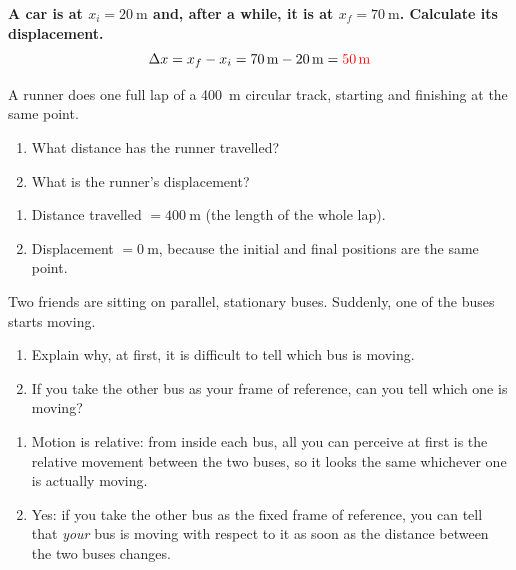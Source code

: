 \begin{example}
    \textbf{A car is at \(x_i = \qty{20}{\m}\) and, after a while, it is at \(x_f = \qty{70}{\m}\). Calculate its displacement.}
    \begin{equation*}
        \Delta x = x_f - x_i = \qty{70}{\m} - \qty{20}{\m} = \textcolor{red}{\qty{50}{\m}}
    \end{equation*}
\end{example}

\begin{exercise}
    A runner does one full lap of a \qty{400}{\m} circular track, starting and finishing at the same point.
    \begin{enumerate}[label=\letraminuscula]
        \item What distance has the runner travelled?
        \item What is the runner's displacement?
    \end{enumerate}
    \begin{solu}
        \begin{enumerate}[label=\alph*)]
            \item Distance travelled \(= \qty{400}{\m}\) (the length of the whole lap).
            \item Displacement \(= \qty{0}{\m}\), because the initial and final positions are the same point.
        \end{enumerate}
    \end{solu}
\end{exercise}

\begin{exercise}
    Two friends are sitting on parallel, stationary buses. Suddenly, one of the buses starts moving.
    \begin{enumerate}[label=\letraminuscula]
        \item Explain why, at first, it is difficult to tell which bus is moving.
        \item If you take the other bus as your frame of reference, can you tell which one is moving?
    \end{enumerate}
    \begin{solu}
        \begin{enumerate}[label=\alph*)]
            \item Motion is relative: from inside each bus, all you can perceive at first is the relative movement between the two buses, so it looks the same whichever one is actually moving.
            \item Yes: if you take the other bus as the fixed frame of reference, you can tell that \emph{your} bus is moving with respect to it as soon as the distance between the two buses changes.
        \end{enumerate}
    \end{solu}
\end{exercise}

